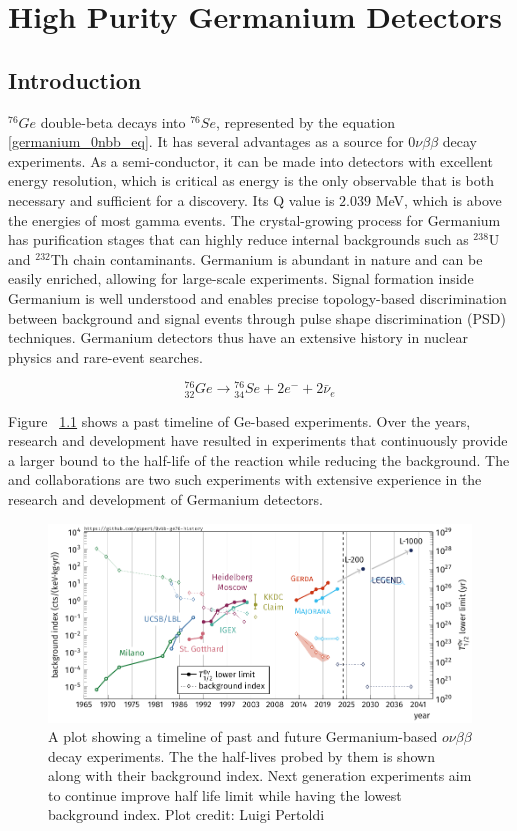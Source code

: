 \chapter{High Purity Germanium Detectors}
\label{chap:detectors}

\section{Introduction}
${}^{76}Ge$ double-beta decays into ${}^{76}Se$, represented by the equation \ref{germanium_0nbb_eq}. It has several advantages as a source for $0\nu\beta\beta$ decay experiments. As a semi-conductor, it can be made into detectors with excellent energy resolution, which is critical as energy is the only observable that is both necessary and sufficient for a discovery. Its Q value is $2.039$ MeV, which is above the energies of most gamma events. The crystal-growing process for Germanium has purification stages that can highly reduce internal backgrounds such as $^{238}$U and $^{232}$Th chain contaminants. Germanium is abundant in nature and can be easily enriched, allowing for large-scale experiments. Signal formation inside Germanium is well understood and enables precise topology-based discrimination between background and signal events through pulse shape discrimination (PSD) techniques. Germanium detectors thus have an extensive history in nuclear physics and rare-event searches.


\begin{equation}\label{germanium_0nbb_eq}
{}_{32}^{76}Ge \rightarrow {}_{34}^{76}Se + 2e^- + 2\bar{\nu}_e
\end{equation}

Figure ~\ref{past_ge_exp} shows a past timeline of Ge-based experiments. Over the years, research and development have resulted in experiments that continuously provide a larger bound to the half-life of the reaction while reducing the background. The {\MJ} and {\Gerda} collaborations are two such experiments with extensive experience in the research and development of Germanium detectors.

\begin{figure}[!htb]
\centering
\includegraphics[trim=0.1cm 0 0.1cm 0,clip, width=0.99\linewidth]{ch2/figs/0nbb-ge76-history-future.pdf}
\caption{A plot showing a timeline of past and future Germanium-based $o\nu\beta\beta$ decay experiments. The the half-lives probed by them is shown along with their background index. Next generation experiments aim to continue improve half life limit while having the lowest background index. Plot credit: Luigi Pertoldi}
\label{past_ge_exp}
\end{figure}


